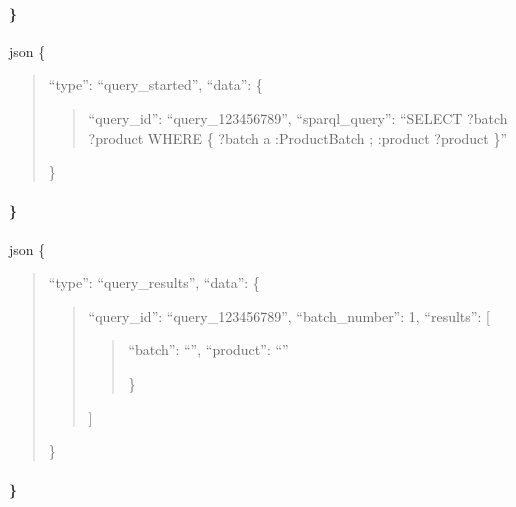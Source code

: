 \documentclass[letterpaper,10pt,english]{sphinxmanual}
\begin{document}
\paragraph{\}}
\label{\detokenize{api/websocket-api:id75}}
\sphinxAtStartPar
{}
{\color{red}\bfseries{}\textasciigrave{}\textasciigrave{}}{\color{red}\bfseries{}\textasciigrave{}}json
\{
\begin{quote}

\sphinxAtStartPar
“type”: “query\_started”,
“data”: \{
\begin{quote}

\sphinxAtStartPar
“query\_id”: “query\_123456789”,
“sparql\_query”: “SELECT ?batch ?product WHERE \{ ?batch a :ProductBatch ; :product ?product \}”
\end{quote}

\sphinxAtStartPar
\}
\end{quote}


\paragraph{\}}
\label{\detokenize{api/websocket-api:id80}}
\sphinxAtStartPar
{}
{\color{red}\bfseries{}\textasciigrave{}\textasciigrave{}}{\color{red}\bfseries{}\textasciigrave{}}json
\{
\begin{quote}

\sphinxAtStartPar
“type”: “query\_results”,
“data”: \{
\begin{quote}

\sphinxAtStartPar
“query\_id”: “query\_123456789”,
“batch\_number”: 1,
“results”: {[}
\begin{quote}
\begin{description}
\sphinxlineitem{\{}
\sphinxAtStartPar
“batch”: “”,
“product”: “”

\end{description}

\sphinxAtStartPar
\}
\end{quote}

\sphinxAtStartPar
{]}
\end{quote}

\sphinxAtStartPar
\}
\end{quote}


\paragraph{\}}
\label{\detokenize{api/websocket-api:id85}}
\end{document}
